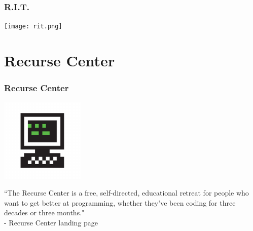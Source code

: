 \documentclass{beamer}
\theoremstyle{mystyle}
\begin{document}
\begin{frame}
\frametitle{R.I.T.}

\begin{center}
	\texttt{[image: rit.png]}
\end{center}

\end{frame}




\section{Recurse Center}
\frame{\tableofcontents[currentsection]}

\begin{frame}
\frametitle{Recurse Center}

\begin{center}
	\includegraphics[width=0.3\textwidth]{recurse_center.png}
\end{center}

\begin{center}
``The Recurse Center is a free, self-directed, educational retreat for people who want to get better at programming, whether they've been coding for three decades or three months." \\


- Recurse Center landing page
\end{center}

\end{frame}

\end{document}
